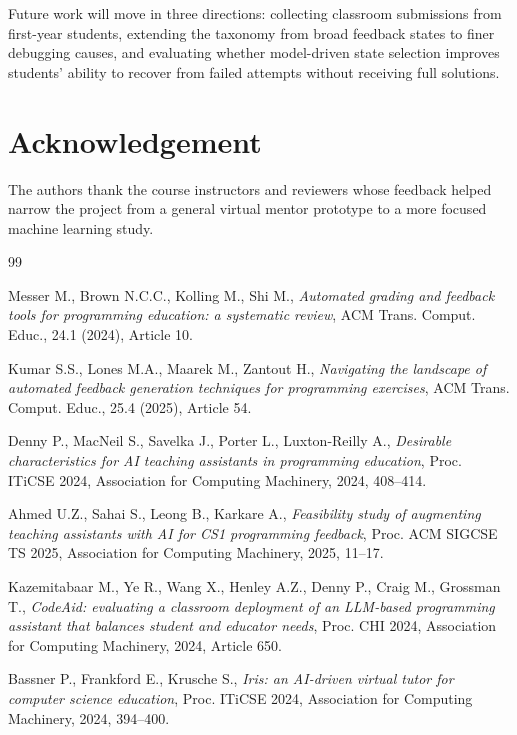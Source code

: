 \documentclass[twoside,11pt]{article}
\begin{document}
Future work will move in three directions: collecting classroom submissions from first-year students, extending the taxonomy from broad feedback states to finer debugging causes, and evaluating whether model-driven state selection improves students' ability to recover from failed attempts without receiving full solutions.

\section*{\large Acknowledgement}
The authors thank the course instructors and reviewers whose feedback helped narrow the project from a general virtual mentor prototype to a more focused machine learning study.

\begin{thebibliography}{99}
\thispagestyle{myheadings}
\vspace*{0mm} \itemsep=-2pt
\footnotesize

 Messer M., Brown N.C.C., Kolling M., Shi M., {\it Automated grading and feedback tools for programming education: a systematic review}, ACM Trans. Comput. Educ., 24.1 (2024), Article 10.

 Kumar S.S., Lones M.A., Maarek M., Zantout H., {\it Navigating the landscape of automated feedback generation techniques for programming exercises}, ACM Trans. Comput. Educ., 25.4 (2025), Article 54.

 Denny P., MacNeil S., Savelka J., Porter L., Luxton-Reilly A., {\it Desirable characteristics for AI teaching assistants in programming education}, Proc. ITiCSE 2024, Association for Computing Machinery, 2024, 408--414.

 Ahmed U.Z., Sahai S., Leong B., Karkare A., {\it Feasibility study of augmenting teaching assistants with AI for CS1 programming feedback}, Proc. ACM SIGCSE TS 2025, Association for Computing Machinery, 2025, 11--17.

 Kazemitabaar M., Ye R., Wang X., Henley A.Z., Denny P., Craig M., Grossman T., {\it CodeAid: evaluating a classroom deployment of an LLM-based programming assistant that balances student and educator needs}, Proc. CHI 2024, Association for Computing Machinery, 2024, Article 650.

 Bassner P., Frankford E., Krusche S., {\it Iris: an AI-driven virtual tutor for computer science education}, Proc. ITiCSE 2024, Association for Computing Machinery, 2024, 394--400.


\end{thebibliography}
\end{document}
